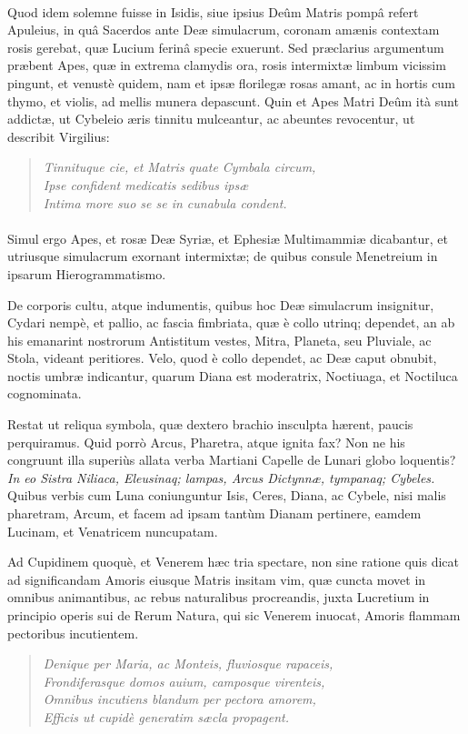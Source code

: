\documentclass[a4paper, 11pt, oneside, polutonikogreek, latin]{article}
\begin{document}
\paragraph{}
Quod idem solemne fuisse in Isidis, siue ipsius Deûm Matris pompâ refert Apuleius, in quâ Sacerdos ante Deæ simulacrum, coronam amænis contextam rosis gerebat, quæ Lucium ferinâ specie exuerunt. Sed præclarius argumentum præbent Apes, quæ in extrema clamydis ora, rosis intermixtæ limbum vicissim pingunt, et venustè quidem, nam et ipsæ florilegæ rosas amant, ac in hortis cum thymo, et violis, ad mellis munera depascunt. Quin et Apes Matri Deûm ità sunt addictæ, ut Cybeleio æris tinnitu mulceantur, ac abeuntes revocentur, ut describit Virgilius:
\begin{quote}
\emph{Tinnituque cie, et Matris quate Cymbala circum,}\\
\emph{Ipse confident medicatis sedibus ipsæ}\\
\emph{Intima more suo se se in cunabula condent.}\\
\end{quote}
\vspace*{-8mm}
\paragraph{}
Simul ergo Apes, et rosæ Deæ Syriæ, et Ephesiæ Multimammiæ dicabantur, et utriusque simulacrum exornant intermixtæ; de quibus consule Menetreium in ipsarum Hierogrammatismo.

De corporis cultu, atque indumentis, quibus hoc Deæ simulacrum insignitur, Cydari nempè, et pallio, ac fascia fimbriata, quæ è collo utrinq; dependet, an ab his emanarint nostrorum Antistitum vestes, Mitra, Planeta, seu Pluviale, ac Stola, videant peritiores. Velo, quod è collo dependet, ac Deæ caput obnubit, noctis umbræ indicantur, quarum Diana est moderatrix, Noctiuaga, et Noctiluca cognominata.

Restat ut reliqua symbola, quæ dextero brachio insculpta hærent, paucis perquiramus. Quid porrò Arcus, Pharetra, atque ignita fax? Non ne his congruunt illa superiùs allata verba Martiani Capelle de Lunari globo loquentis? \emph{In eo Sistra Niliaca, Eleusinaq; lampas, Arcus Dictynnæ, tympanaq; Cybeles.} Quibus verbis cum Luna coniunguntur Isis, Ceres, Diana, ac Cybele, nisi malis pharetram, Arcum, et facem ad ipsam tantùm Dianam pertinere, eamdem Lucinam, et Venatricem nuncupatam.

Ad Cupidinem quoquè, et Venerem hæc tria spectare, non sine ratione quis dicat ad significandam Amoris eiusque Matris insitam vim, quæ cuncta movet in omnibus animantibus, ac rebus naturalibus procreandis, juxta Lucretium in principio operis sui de Rerum Natura, qui sic Venerem inuocat, Amoris flammam pectoribus incutientem.
\begin{quote}
\emph{Denique per Maria, ac Monteis, fluviosque rapaceis,}\\
\emph{Frondiferasque domos auium, camposque virenteis,}\\
\emph{Omnibus incutiens blandum per pectora amorem,}\\
\emph{Efficis ut cupidè generatim sæcla propagent.}\\
\end{quote}
\vspace*{-8mm}
\end{document}
